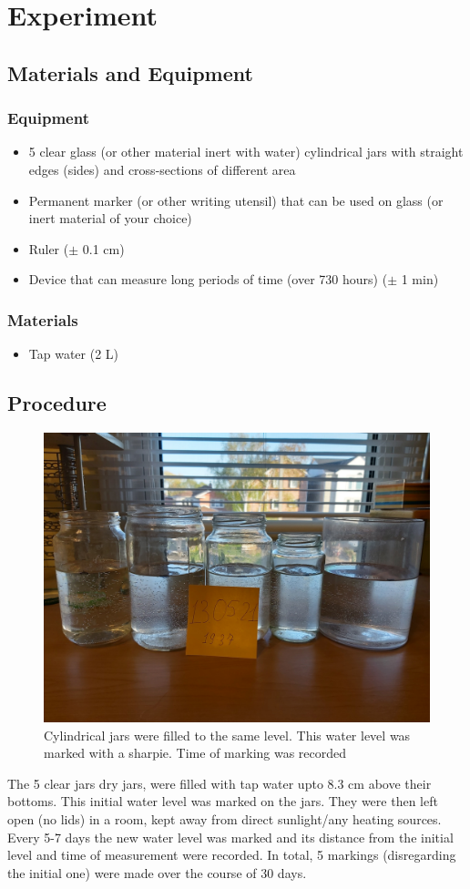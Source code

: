 \documentclass[12pt,letterpaper,final]{report}
\begin{document}
\section{Experiment}

\subsection{Materials and Equipment}
\subsubsection*{Equipment}
\begin{itemize}
\item 5 clear glass (or other material inert with water) cylindrical jars with straight edges (sides) and cross-sections of different area 

\item Permanent marker (or other writing utensil) that can be used on glass (or inert material of your choice)

\item Ruler ($\pm$ 0.1 cm)
\item Device that can measure long periods of time (over 730 hours) ($\pm$ 1 min)
\end{itemize}
\subsubsection*{Materials}
\begin{itemize}
\item Tap water (2 L)
\end{itemize}
\pagebreak
\subsection{Procedure}
\begin{figure}
\includegraphics[width=0.2 \textwidth]{Jars1.jpg}
\caption{Cylindrical jars were filled to the same level. This water level was marked with a sharpie. Time of marking was recorded}
\end{figure}
The 5 clear jars dry jars, were filled with tap water upto 8.3 cm above their bottoms. This initial water level was marked on the jars. They were then left open (no lids) in a room, kept away from direct sunlight/any heating sources. Every 5-7 days the new water level was marked and its distance from the initial level and time of measurement were recorded. In total, 5 markings (disregarding the initial one) were made over the course of 30 days.
\end{document}
